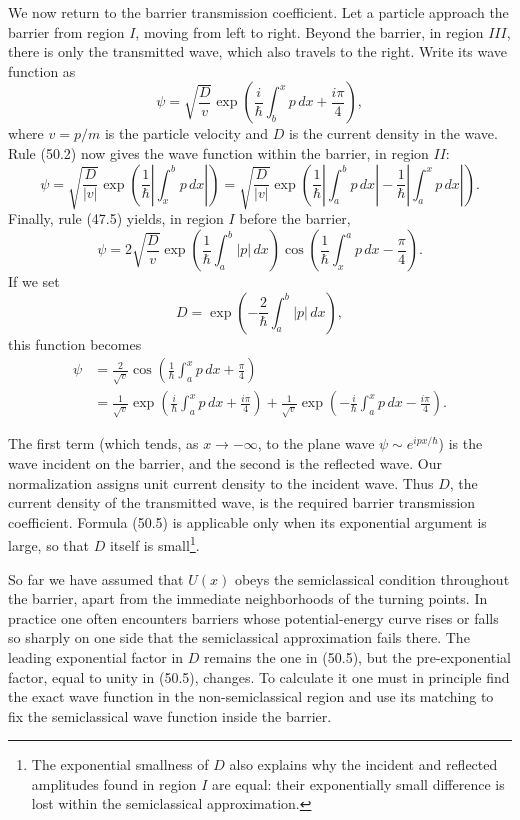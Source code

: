 We now return to the barrier transmission coefficient. Let a particle approach
the barrier from region $I$, moving from left to right. Beyond the barrier, in
region $III$, there is only the transmitted wave, which also travels to the
right. Write its wave function as
\begin{equation}
 \psi=\sqrt{\frac Dv}\exp\left(\frac{i}{\hbar}\int_b^x p\,dx+\frac{i\pi}{4}\right),
 \tag{50.3}
\end{equation}
where $v=p/m$ is the particle velocity and $D$ is the current density in the
wave. Rule (50.2) now gives the wave function within the barrier, in region
$II$:
\begin{equation}
 \psi=\sqrt{\frac D{|v|}}\exp\left(\frac1\hbar\left|\int_x^b p\,dx\right|\right)
 =\sqrt{\frac D{|v|}}\exp\left(\frac1\hbar\left|\int_a^b p\,dx\right|
 -\frac1\hbar\left|\int_a^x p\,dx\right|\right).
 \tag{50.4}
\end{equation}
Finally, rule (47.5) yields, in region $I$ before the barrier,
\[
 \psi=2\sqrt{\frac Dv}\exp\left(\frac1\hbar\int_a^b|p|\,dx\right)
 \cos\left(\frac1\hbar\int_x^a p\,dx-\frac\pi4\right).
\]
If we set
\begin{equation}
 D=\exp\left(-\frac2\hbar\int_a^b|p|\,dx\right),
 \tag{50.5}
\end{equation}
this function becomes
\[
 \begin{split}
 \psi&=\frac2{\sqrt v}\cos\left(\frac1\hbar\int_a^x p\,dx+\frac\pi4\right)\\
 &=\frac1{\sqrt v}\exp\left(\frac{i}{\hbar}\int_a^x p\,dx+\frac{i\pi}{4}\right)
 +\frac1{\sqrt v}\exp\left(-\frac{i}{\hbar}\int_a^x p\,dx-\frac{i\pi}{4}\right).
 \end{split}
\]

The first term (which tends, as $x\to-\infty$, to the plane wave
$\psi\sim e^{ipx/\hbar}$) is the wave incident on the barrier, and the second
is the reflected wave. Our normalization assigns unit current density to the
incident wave. Thus $D$, the current density of the transmitted wave, is the
required barrier transmission coefficient. Formula (50.5) is applicable only
when its exponential argument is large, so that $D$ itself is small\footnote{The
exponential smallness of $D$ also explains why the incident and reflected
amplitudes found in region $I$ are equal: their exponentially small difference
is lost within the semiclassical approximation.}.

So far we have assumed that $U(x)$ obeys the semiclassical condition throughout
the barrier, apart from the immediate neighborhoods of the turning points. In
practice one often encounters barriers whose potential-energy curve rises or
falls so sharply on one side that the semiclassical approximation fails there.
The leading exponential factor in $D$ remains the one in (50.5), but the
pre-exponential factor, equal to unity in (50.5), changes. To calculate it one
must in principle find the exact wave function in the non-semiclassical region
and use its matching to fix the semiclassical wave function inside the barrier.


